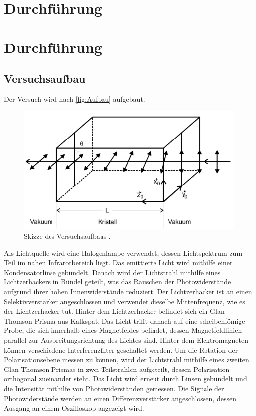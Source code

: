 \section{Durchführung}
\label{sec:Durchführung}

\section{Durchführung}
\label{sec:Durchführung}

\subsection{Versuchsaufbau}
\label{subsec:Versuchsaufbau}

Der Versuch wird nach \autoref{fig:Aufbau} aufgebaut.
\begin{figure}[H]
	\centering
    \includegraphics[width=0.6\linewidth]{data/PolarisationDrehung.png}
	\caption{Skizze des Versuchsaufbaus .\cite{Anleitung46}}
	\label{fig:Aufbau}
\end{figure}

Als Lichtquelle wird eine Halogenlampe verwendet, dessen Lichtspektrum zum 
Teil im nahen Infrarotbereich liegt. 
Das emittierte Licht wird mithilfe einer Kondensatorlinse gebündelt. 
Danach wird der Lichtstrahl mithilfe eines Lichtzerhackers in Bündel 
geteilt,
was das Rauschen der Photowiderstände aufgrund ihrer hohen 
Innenwiderstände reduziert. Der Lichtzerhacker ist an einen 
Selektivverstärker angeschlossen und verwendet dieselbe Mittenfrequenz,
wie es der Lichtzerhacker tut. Hinter dem Lichtzerhacker befindet sich ein 
Glan-Thomson-Prisma aus Kalkspat.
Das Licht trifft danach auf eine scheibenfömige Probe, die sich innerhalb eines Magnetfeldes befindet, dessen
Magnetfeldlinien parallel zur Ausbreitungsrichtung des Lichtes sind. Hinter dem Elektromagneten können verschiedene Interferenzfilter
geschaltet werden. Um die Rotation der Polarisationsebene messen zu können, wird der Lichtstrahl mithilfe eines zweiten Glan-Thomson-Prismas
in zwei Teilstrahlen aufgeteilt, dessen Polarisation orthogonal zueinander steht. Das Licht wird erneut durch Linsen gebündelt und die Intensität mithilfe von
Photowiderständen gemessen. Die Signale der Photowiderstände werden an einen Differenzverstärker angeschlossen, dessen Ausgang
an einem Oszilloskop angezeigt wird.

